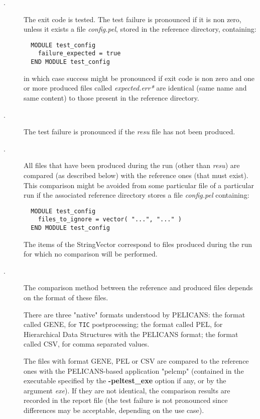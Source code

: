 \documentclass{article}
\begin{document}
\begin{description}
\item[.] \mbox{}

The exit code is tested. The test failure is pronounced
if it is non zero, unless it exists a file \emph{config.pel}, stored in
the reference directory, containing:

\begin{verbatim}
  MODULE test_config
    failure_expected = true
  END MODULE test_config
\end{verbatim}


in which case success might be pronounced if exit code is non zero and
one or more produced files called \emph{expected.err*} are identical
(same name and same content) to those present in the reference directory.


\item[.] \mbox{}

The test failure is pronounced if the \emph{resu} file has not been produced.


\item[.] \mbox{}

All files that have been produced during the run (other than \emph{resu}) 
are compared (as described below) with the reference ones (that must exist).
This comparison might be avoided from some particular file of a particular
run if the associated reference directory stores a file \emph{config.pel}
containing:

\begin{verbatim}
  MODULE test_config
    files_to_ignore = vector( "...", "..." )
  END MODULE test_config
\end{verbatim}


The items of the StringVector correspond to files produced during the run for
which no comparison will be performed.


\item[.] \mbox{}

The comparison method between the reference and produced files
depends on the format of these files.



There are three "native" formats understood by PELICANS:
the format called GENE, for \texttt{TIC} postprocessing; the
format called PEL, for Hierarchical Data Structures with the PELICANS format;
the format called CSV, for comma separated values.



The files with format GENE, PEL or CSV are compared to the reference ones
with the PELICANS-based application "pelcmp" (contained in the
executable specified by the \textbf{-peltest\_exe} option if any, or by the
argument \emph{exe}). If they are not identical, the comparison results
are recorded in the report file (the test failure is not pronounced since
differences may be acceptable, depending on the use case).




\end{description}
\end{document}

